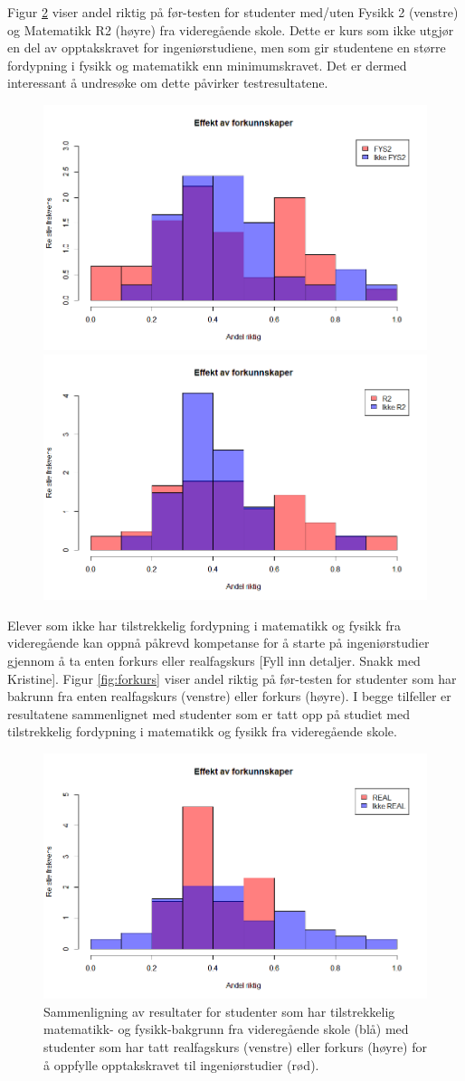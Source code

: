 \documentclass[a4paper,norsk,12pt]{report}
\begin{document}
Figur \ref{fig:fysmat} viser andel riktig på før-testen for studenter med/uten Fysikk 2 (venstre) og Matematikk R2 (høyre) fra videregående skole. Dette er kurs som ikke utgjør en del av opptakskravet for ingeniørstudiene, men som gir studentene en større fordypning i fysikk og matematikk enn minimumskravet. Det er dermed interessant å undresøke om dette påvirker testresultatene.
\begin{figure}[p]
	\includegraphics[width=.48\textwidth]{./fys2}
	\includegraphics[width=.48\textwidth]{./r2}
	\caption{}
	\label{fig:fysmat}
\end{figure}
Elever som ikke har tilstrekkelig fordypning i matematikk og fysikk fra videregående kan oppnå påkrevd kompetanse for å starte på ingeniørstudier gjennom å ta enten forkurs eller realfagskurs {\color{red}[Fyll inn detaljer. Snakk med Kristine]}. Figur \ref{fig:forkurs} viser andel riktig på før-testen for studenter som har bakrunn fra enten realfagskurs (venstre) eller forkurs (høyre). I begge tilfeller er resultatene sammenlignet med studenter som er tatt opp på studiet med tilstrekkelig fordypning i matematikk og fysikk fra videregående skole.
\begin{figure}[p]
	\includegraphics[width=.48\textwidth]{./real}
	\caption{ Sammenligning av resultater for studenter som har tilstrekkelig matematikk- og fysikk-bakgrunn fra videregående skole (blå) med studenter som har tatt realfagskurs (venstre) eller forkurs (høyre) for å oppfylle opptakskravet til ingeniørstudier (rød).}
	\label{fig:fysmat}
\end{figure}
\end{document}
